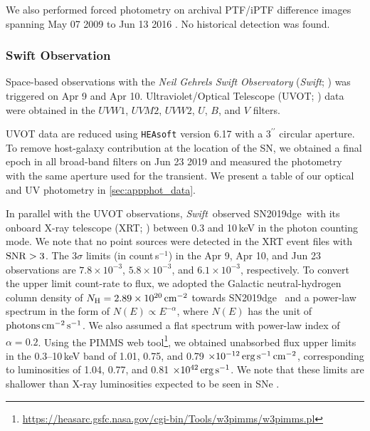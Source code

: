 \documentclass[twocolumn]{aastex63}
\newcommand{\name}{SN2019dge}
\newcommand{\swift}{\textit{Swift}}
\begin{document}
\begin{CJK*}{UTF8}{gbsn}
We also performed forced photometry on archival PTF/iPTF difference images spanning May 07 2009 to 
Jun 13 2016 \citep{Law2009, Rau2009}.
No historical detection was found. 

 
 
\subsubsection{Swift Observation}\label{subsubsec:swift}
Space-based observations with the \textit{Neil Gehrels Swift Observatory} (\swift; 
\citealt{Gehrels2004}) was triggered on Apr 9 and Apr 10. Ultraviolet/Optical Telescope (UVOT; 
\citealt{Roming2005}) data were obtained in the $UVW1$, $UVM2$, $UVW2$, $U$, $B$, and $V$ 
filters. 

UVOT data are reduced using \texttt{HEAsoft} \citep{Heasarc} version 6.17 with a $3^{\prime\prime}$ 
circular aperture. To remove host-galaxy contribution at the location of the SN, we obtained a final 
epoch in all broad-band filters 
on Jun 23 2019 and measured the photometry with the same aperture used for the transient. We 
present a table of our optical and UV photometry in \ref{sec:appphot_data}.


In parallel with the UVOT observations, \swift\ observed \name\ with its onboard X-ray telescope
(XRT; \citealt{Burrows2005}) between 0.3 and 10\,keV in the photon counting mode. We note that no 
point sources were detected in the XRT event files with $\rm{SNR}>3$. The 3$\sigma$ limits (in 
count\,s$^{-1}$) in the Apr 9, Apr 10, and Jun 23 observations are $7.8\times 
10^{-3}$, $5.8\times 10^{-3}$, and $6.1\times 10^{-3}$, respectively. 
To convert the upper limit count-rate to flux, we adopted the Galactic neutral-hydrogen column 
density of $N_{\rm H} 
= 2.89\times 10^{20}\,{\rm cm^{-2}}$ towards \name\ \citep{Willingale2013} and a power-law spectrum 
in the form of $N(E) \propto E^{-\alpha}$, where $N(E)$ has the unit of $\rm 
photons\,cm^{-2}\,s^{-1}$. We also assumed a flat spectrum with power-law index of $\alpha = 0.2$. 
Using the PIMMS web 
tool\footnote{\url{https://heasarc.gsfc.nasa.gov/cgi-bin/Tools/w3pimms/w3pimms.pl}}, we obtained 
unabsorbed flux upper limits in the 0.3--10\,keV band of 1.01, 0.75, and 0.79 $\times 
10^{-12}\,{\rm erg\,s^{-1}\,cm^{-2}}$, corresponding to luminosities of 1.04, 0.77, and 0.81 $\times 
10^{42}\,{\rm erg\,s^{-1}}$. We note that these limits are shallower than X-ray luminosities expected to 
be seen in SNe \citep{OfekXray2013}.


\end{CJK*}
\end{document}
